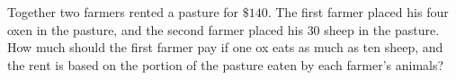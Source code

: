 Together two farmers rented a pasture for $\$140$. The first farmer placed his four oxen in the pasture, and the second farmer placed his $30$ sheep in the pasture. How much should the first farmer pay if one ox eats as much as ten sheep, and the rent is based on the portion of the pasture eaten by each farmer's animals?

